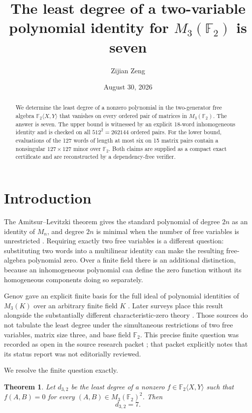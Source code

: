 \documentclass[11pt]{amsart}
\title[The least two-variable identity degree is seven]
{The least degree of a two-variable polynomial identity for
\(M_3(\mathbb F_2)\) is seven}
\author{Zijian Zeng}
\date{August 30, 2026}
\newtheorem{theorem}{Theorem}[section]
\theoremstyle{definition}
\newcommand{\F}{\mathbb F}
\newcommand{\Mat}{M_3(\F_2)}
\begin{document}
\begin{abstract}
We determine the least degree of a nonzero polynomial in the two-generator free
algebra \(\F_2\langle X,Y\rangle\) that vanishes on every ordered pair of
matrices in \(M_3(\F_2)\).  The answer is seven.  The upper bound is witnessed
by an explicit 18-word inhomogeneous identity and is checked on all
\(512^2=262144\) ordered pairs.  For the lower bound, evaluations of the 127
words of length at most six on 15 matrix pairs contain a nonsingular
\(127\times127\) minor over \(\F_2\).  Both claims are supplied as a compact
exact certificate and are reconstructed by a dependency-free verifier.
\end{abstract}

\maketitle

\section{Introduction}

The Amitsur--Levitzki theorem gives the standard polynomial of degree \(2n\)
as an identity of \(M_n\), and degree \(2n\) is minimal when the number of free
variables is unrestricted \cite{AmitsurLevitzki1950}.  Requiring exactly two
free variables is a different question: substituting two words into a
multilinear identity can make the resulting free-algebra polynomial zero.  Over
a finite field there is an additional distinction, because an inhomogeneous
polynomial can define the zero function without its homogeneous components
doing so separately.

Genov gave an explicit finite basis for the full ideal of polynomial identities
of \(M_3(K)\) over an arbitrary finite field \(K\)
\cite{Genov1981}.  Later surveys place this result alongside the substantially
different characteristic-zero theory \cite{Drensky2021}.  Those sources do not
tabulate the least degree under the simultaneous restrictions of two free
variables, matrix size three, and base field \(\F_2\).  This precise finite
question was recorded as open in the source research packet
\cite{TheoremDBP2746}; that packet explicitly notes that its status report was
not editorially reviewed.

We resolve the finite question exactly.

\begin{theorem}\label{thm:main}
Let \(d_{3,2}\) be the least degree of a nonzero
\(f\in\F_2\langle X,Y\rangle\) such that
\(f(A,B)=0\) for every \((A,B)\in\Mat^2\).  Then
\[
d_{3,2}=7.
\]
\end{theorem}
\end{document}
